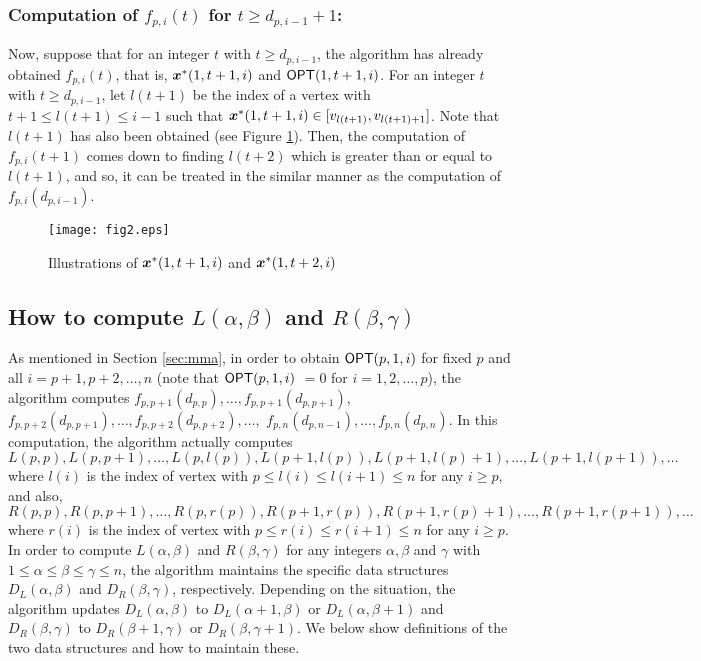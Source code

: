 \documentclass[a4paper]{llncs}
\newcommand{\bm}[1]{\mbox{\boldmath{$#1$}}}
\begin{document}
\subsubsection{Computation of $f_{p, i}(t)$ for $t \ge d_{p, i-1}+1$:}
Now, suppose that for an integer $t$ with $t \ge d_{p, i-1}$,
the algorithm has already obtained $f_{p, i}(t)$, that is, ${\bm x}^*(1, t+1, i)$ and ${\sf OPT}(1, t+1, i)$.
For an integer $t$ with $t \ge d_{p, i-1}$, let $l(t+1)$ be the index of a vertex with $t+1 \le l(t+1) \le i-1$
such that ${\bm x}^*(1, t+1, i) \in [v_{l(t+1)}, v_{l(t+1)+1}]$.
Note that $l(t+1)$ has also been obtained (see Figure \ref{fig2}).
Then, the computation of $f_{p, i}(t+1)$ comes down to finding $l(t+2)$ which is greater than or equal to $l(t+1)$,
and so, it can be treated in the similar manner as the computation of $f_{p, i}(d_{p, i-1})$.
\begin{figure}[h]
\centering
\texttt{[image: fig2.eps]} 
\caption{Illustrations of ${\bm x}^*(1, t+1, i)$ and ${\bm x}^*(1, t+2, i)$}
\label{fig2}
\end{figure}




\subsection{How to compute $L(\alpha, \beta)$ and $R(\beta, \gamma)$}
\label{s2}
As mentioned in Section \ref{sec:mma}, in order to obtain ${\sf OPT}(p, 1, i)$ for fixed $p$ and all $i=p+1, p+2, \ldots, n$
(note that ${\sf OPT}(p, 1, i)$ $ = 0$ for $i=1, 2, \ldots, p$), 
the algorithm computes $f_{p, p+1}(d_{p, p}),\ldots,f_{p, p+1}(d_{p, p+1})$,
$f_{p, p+2}(d_{p, p+1}),\ldots,f_{p, p+2}(d_{p, p+2}),\ldots,$
$f_{p, n}(d_{p, n-1}),\ldots,f_{p, n}(d_{p, n})$.
In this computation,
the algorithm actually computes $L(p, p),L(p, p+1),\ldots,L(p, l(p)),L(p+1, l(p)),L(p+1, l(p)+1),\ldots, L(p+1, l(p+1)),\ldots$
where $l(i)$ is the index of vertex with $p \le l(i) \le l(i+1) \le n$ for any $i \ge p$,
and also, $R(p, p),R(p, p+1),\ldots,R(p, r(p)),R(p+1, r(p)),R(p+1, r(p)+1),\ldots, R(p+1, r(p+1)),\ldots$
where $r(i)$ is the index of vertex with $p \le r(i) \le r(i+1) \le n$ for any $i \ge p$.
In order to compute $L(\alpha, \beta)$ and $R(\beta, \gamma)$ for any integers $\alpha, \beta$ and $\gamma$ with $1 \le \alpha \le \beta \le \gamma \le n$, 
the algorithm maintains the specific data structures $D_L(\alpha, \beta)$ and $D_R(\beta, \gamma)$, respectively.
Depending on the situation, the algorithm updates $D_L(\alpha, \beta)$ to $D_L(\alpha+1, \beta)$ or $D_L(\alpha, \beta+1)$ and $D_R(\beta, \gamma)$ to $D_R(\beta+1, \gamma)$ or $D_R(\beta, \gamma+1)$.
We below show definitions of the two data structures and how to maintain these.
\end{document}
